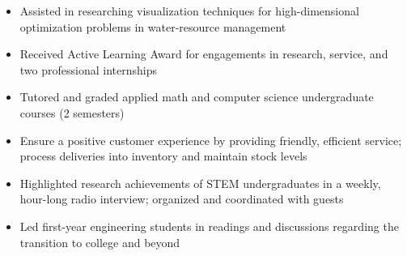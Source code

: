 \documentclass[10pt,letterpaper,ragged2e,withhyper]{altacv}
\begin{document}
\begin{paracol}{2}
  \vspace{-0.75em}
  \divider

  \begin{itemize}
    \item Assisted in researching visualization techniques for high-dimensional optimization problems in water-resource management
    \item Received Active Learning Award for engagements in research, service, and two professional internships
    \item Tutored and graded applied math and computer science undergraduate courses (2 semesters)
  \end{itemize}

  \medskip

  \begin{itemize}
    \item Ensure a positive customer experience by providing friendly, efficient service; process deliveries into inventory and maintain stock levels
  \end{itemize}

  \vspace{-0.75em}
  \divider

  \begin{itemize}
    \item Highlighted research achievements of STEM undergraduates in a weekly, hour-long radio interview; organized and coordinated with guests
  \end{itemize}

  \vspace{-0.75em}
  \divider

  \begin{itemize}
    \item Led first-year engineering students in readings and discussions regarding the transition to college and beyond
  \end{itemize}

  \switchcolumn


\end{paracol}
\end{document}
